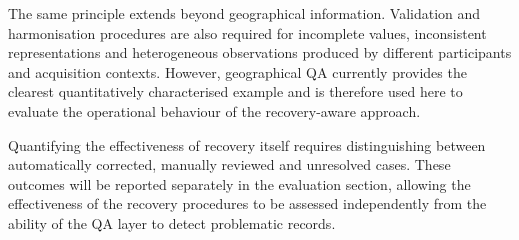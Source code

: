 The same principle extends beyond geographical information. Validation and harmonisation procedures are also required for incomplete values, inconsistent representations and heterogeneous observations produced by different participants and acquisition contexts. However, geographical QA currently provides the clearest quantitatively characterised example and is therefore used here to evaluate the operational behaviour of the recovery-aware approach.

Quantifying the effectiveness of recovery itself requires distinguishing between automatically corrected, manually reviewed and unresolved cases. These outcomes will be reported separately in the evaluation section, allowing the effectiveness of the recovery procedures to be assessed independently from the ability of the QA layer to detect problematic records.